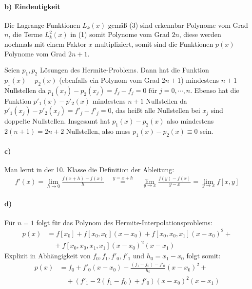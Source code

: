 \paragraph*{b) Eindeutigkeit}
Die Lagrange-Funktionen $L_k(x)$ gemäß (3) sind erkennbar Polynome vom Grad $n$,
die Terme $L_k^2(x)$ in (1) somit Polynome vom Grad $2n$, diese werden nochmals mit
einem Faktor $x$ multipliziert, somit sind die Funktionen $p(x)$ Polynome vom
Grad $2 n + 1$.

Seien $p_1, p_2$ Lösungen des Hermite-Problems. Dann hat
die Funktion $p_1(x) - p_2(x)$ (ebenfalls ein Polynom vom Grad $2 n + 1$)
mindestens $n + 1$ Nullstellen da
$p_1(x_j) - p_2(x_j) = f_j - f_j = 0 \text{ für } j = 0, \cdots , n$.
Ebenso hat die Funktion $p'_1(x) - p'_2(x)$  mindestens $n + 1$ Nullstellen da
$p'_1(x_j) - p'_2(x_j) = f'_j - f'_j = 0$, das heißt alle Nullstellen bei $x_j$ sind
doppelte Nullstellen. Insgesamt hat  $p_1(x) - p_2(x)$ also mindestens
$2 (n + 1) = 2 n + 2$ Nullstellen, also muss $p_1(x) - p_2(x) \equiv 0$ sein.

\paragraph*{c)}
Man lernt in der 10. Klasse die Definition der Ableitung:
\begin{align*}
  f'(x) = \lim_{h \rightarrow 0} \frac{f(x + h) - f(x)}{h} \quad \overset{y = x + h}{=}\quad
  \lim_{y \rightarrow x} \frac{f(y) - f(x)}{y - x} =  \lim_{y \rightarrow x} f[x,y]
\end{align*}

\paragraph*{d)}
Für $n=1$ folgt für das Polynom des Hermite-Interpolationsproblems:
\begin{align*}
p(x) &= f[x_0] + f[x_0,x_0](x-x_0) + f[x_0,x_0,x_1](x-x_0)^2 + \\
	& \quad + f[x_0,x_0,x_1,x_1](x-x_0)^2(x-x_1)
\end{align*}
Explizit in Abhängigkeit von $f_0,f_1,f'_0,f'_1$ und $h_0=x_1-x_0$ folgt somit:
\begin{align*}
p(x) &= f_0 + f'_0(x-x_0) + \frac{(f_1-f_0)-f'_0}{h_0}(x-x_0)^2 + \\
	  & \quad + (f'_1-2(f_1-f_0)+f'_0)(x-x_0)^2(x-x_1)
\end{align*}
